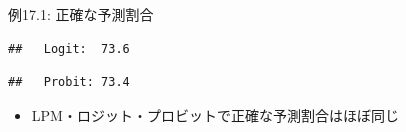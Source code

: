 \documentclass[
  ignorenonframetext,
]{beamer}
\newenvironment{Shaded}{\begin{snugshade}}{\end{snugshade}}
\newcommand{\DecValTok}[1]{\textcolor[rgb]{0.00,0.00,0.81}{#1}}
\newcommand{\FunctionTok}[1]{\textcolor[rgb]{0.00,0.00,0.00}{#1}}
\newcommand{\NormalTok}[1]{#1}
\newcommand{\SpecialCharTok}[1]{\textcolor[rgb]{0.00,0.00,0.00}{#1}}
\newcommand{\StringTok}[1]{\textcolor[rgb]{0.31,0.60,0.02}{#1}}
\providecommand{\tightlist}{%
  \setlength{\itemsep}{0pt}\setlength{\parskip}{0pt}}
\begin{document}
\begin{frame}[fragile]{例17.1: 正確な予測割合}
\begin{verbatim}
##   Logit:  73.6
\end{verbatim}

\begin{Shaded}
\end{Shaded}

\begin{verbatim}
##   Probit: 73.4
\end{verbatim}

\normalsize

\begin{itemize}
\tightlist
\item
  LPM・ロジット・プロビットで正確な予測割合はほぼ同じ
\end{itemize}
\end{frame}
\end{document}
